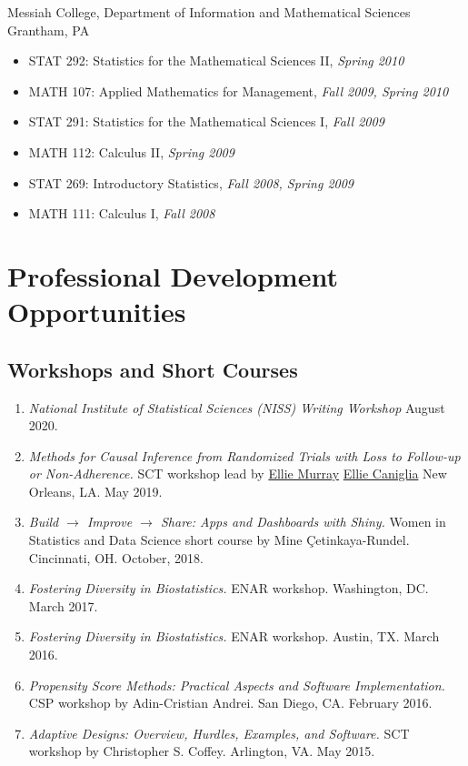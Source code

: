 \documentclass[
  fleqn, oneside]{article}
\providecommand{\tightlist}{%
  \setlength{\itemsep}{0pt}\setlength{\parskip}{0pt}}
\begin{document}
Messiah College, Department of Information and Mathematical Sciences
\newline Grantham, PA

\begin{itemize}
\tightlist
\item
  STAT 292: Statistics for the Mathematical Sciences II, \emph{Spring
  2010}
\item
  MATH 107: Applied Mathematics for Management, \emph{Fall 2009, Spring
  2010}
\item
  STAT 291: Statistics for the Mathematical Sciences I, \emph{Fall 2009}
\item
  MATH 112: Calculus II, \emph{Spring 2009}
\item
  STAT 269: Introductory Statistics, \emph{Fall 2008, Spring 2009}
\item
  MATH 111: Calculus I, \emph{Fall 2008}
\end{itemize}

\hypertarget{professional-development-opportunities}{%
\section{Professional Development
Opportunities}\label{professional-development-opportunities}}

\hypertarget{workshops-and-short-courses}{%
\subsection{Workshops and Short
Courses}\label{workshops-and-short-courses}}

\begin{enumerate}
\def\labelenumi{\arabic{enumi}.}
\item
  \emph{National Institute of Statistical Sciences (NISS) Writing
  Workshop} August 2020.
\item
  \emph{Methods for Causal Inference from Randomized Trials with Loss to
  Follow-up or Non-Adherence.} SCT workshop lead by
  \href{https://www.bu.edu/sph/profile/eleanor-murray/}{Ellie Murray}
  \href{https://med.nyu.edu/faculty/ellen-c-caniglia}{Ellie Caniglia}
  New Orleans, LA. May 2019.
\item
  \emph{Build \(\rightarrow\) Improve \(\rightarrow\) Share: Apps and
  Dashboards with Shiny.} Women in Statistics and Data Science short
  course by Mine Çetinkaya-Rundel. Cincinnati, OH. October, 2018.
\item
  \emph{Fostering Diversity in Biostatistics.} ENAR workshop.
  Washington, DC. March 2017.
\item
  \emph{Fostering Diversity in Biostatistics.} ENAR workshop. Austin,
  TX. March 2016.
\item
  \emph{Propensity Score Methods: Practical Aspects and Software
  Implementation.} CSP workshop by Adin-Cristian Andrei. San Diego, CA.
  February 2016.
\item
  \emph{Adaptive Designs: Overview, Hurdles, Examples, and Software.}
  SCT workshop by Christopher S. Coffey. Arlington, VA. May 2015.
\end{enumerate}
\end{document}
